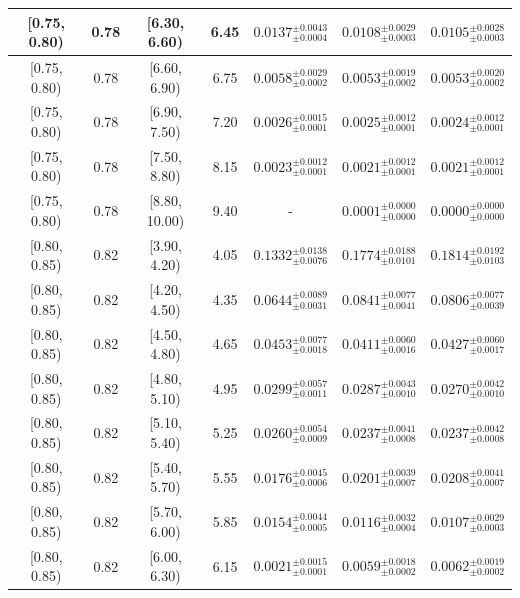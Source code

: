 \begin{longtable}{|c|c|c|c|c|c|c|}
\hline
[0.75, 0.80) & 0.78 & [6.30, 6.60) & 6.45 & $0.0137^{ \pm 0.0043 }_{ \pm 0.0004 }$ & $0.0108^{ \pm 0.0029 }_{ \pm 0.0003 }$ & $0.0105^{ \pm 0.0028 }_{ \pm 0.0003 }$ \\ 
\hline
[0.75, 0.80) & 0.78 & [6.60, 6.90) & 6.75 & $0.0058^{ \pm 0.0029 }_{ \pm 0.0002 }$ & $0.0053^{ \pm 0.0019 }_{ \pm 0.0002 }$ & $0.0053^{ \pm 0.0020 }_{ \pm 0.0002 }$ \\ 
\hline
[0.75, 0.80) & 0.78 & [6.90, 7.50) & 7.20 & $0.0026^{ \pm 0.0015 }_{ \pm 0.0001 }$ & $0.0025^{ \pm 0.0012 }_{ \pm 0.0001 }$ & $0.0024^{ \pm 0.0012 }_{ \pm 0.0001 }$ \\ 
\hline
[0.75, 0.80) & 0.78 & [7.50, 8.80) & 8.15 & $0.0023^{ \pm 0.0012 }_{ \pm 0.0001 }$ & $0.0021^{ \pm 0.0012 }_{ \pm 0.0001 }$ & $0.0021^{ \pm 0.0012 }_{ \pm 0.0001 }$ \\ 
\hline
[0.75, 0.80) & 0.78 & [8.80, 10.00) & 9.40 & - & $0.0001^{ \pm 0.0000 }_{ \pm 0.0000 }$ & $0.0000^{ \pm 0.0000 }_{ \pm 0.0000 }$ \\ 
\hline
[0.80, 0.85) & 0.82 & [3.90, 4.20) & 4.05 & $0.1332^{ \pm 0.0138 }_{ \pm 0.0076 }$ & $0.1774^{ \pm 0.0188 }_{ \pm 0.0101 }$ & $0.1814^{ \pm 0.0192 }_{ \pm 0.0103 }$ \\ 
\hline
[0.80, 0.85) & 0.82 & [4.20, 4.50) & 4.35 & $0.0644^{ \pm 0.0089 }_{ \pm 0.0031 }$ & $0.0841^{ \pm 0.0077 }_{ \pm 0.0041 }$ & $0.0806^{ \pm 0.0077 }_{ \pm 0.0039 }$ \\ 
\hline
[0.80, 0.85) & 0.82 & [4.50, 4.80) & 4.65 & $0.0453^{ \pm 0.0077 }_{ \pm 0.0018 }$ & $0.0411^{ \pm 0.0060 }_{ \pm 0.0016 }$ & $0.0427^{ \pm 0.0060 }_{ \pm 0.0017 }$ \\ 
\hline
[0.80, 0.85) & 0.82 & [4.80, 5.10) & 4.95 & $0.0299^{ \pm 0.0057 }_{ \pm 0.0011 }$ & $0.0287^{ \pm 0.0043 }_{ \pm 0.0010 }$ & $0.0270^{ \pm 0.0042 }_{ \pm 0.0010 }$ \\ 
\hline
[0.80, 0.85) & 0.82 & [5.10, 5.40) & 5.25 & $0.0260^{ \pm 0.0054 }_{ \pm 0.0009 }$ & $0.0237^{ \pm 0.0041 }_{ \pm 0.0008 }$ & $0.0237^{ \pm 0.0042 }_{ \pm 0.0008 }$ \\ 
\hline
[0.80, 0.85) & 0.82 & [5.40, 5.70) & 5.55 & $0.0176^{ \pm 0.0045 }_{ \pm 0.0006 }$ & $0.0201^{ \pm 0.0039 }_{ \pm 0.0007 }$ & $0.0208^{ \pm 0.0041 }_{ \pm 0.0007 }$ \\ 
\hline
[0.80, 0.85) & 0.82 & [5.70, 6.00) & 5.85 & $0.0154^{ \pm 0.0044 }_{ \pm 0.0005 }$ & $0.0116^{ \pm 0.0032 }_{ \pm 0.0004 }$ & $0.0107^{ \pm 0.0029 }_{ \pm 0.0003 }$ \\ 
\hline
[0.80, 0.85) & 0.82 & [6.00, 6.30) & 6.15 & $0.0021^{ \pm 0.0015 }_{ \pm 0.0001 }$ & $0.0059^{ \pm 0.0018 }_{ \pm 0.0002 }$ & $0.0062^{ \pm 0.0019 }_{ \pm 0.0002 }$ \\ 

\end{longtable}
